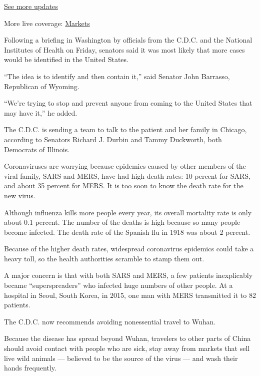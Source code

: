 \href{https://www.nytimes3xbfgragh.onion/2020/09/09/world/covid-19-coronavirus.html?action=click\&pgtype=Article\&state=default\&region=MAIN_CONTENT_1\&context=storylines_live_updates}{See
more updates}

More live coverage:
\href{https://www.nytimes3xbfgragh.onion/live/2020/09/09/business/stock-market-today-coronavirus?action=click\&pgtype=Article\&state=default\&region=MAIN_CONTENT_1\&context=storylines_live_updates}{Markets}

Following a briefing in Washington by officials from the C.D.C. and the
National Institutes of Health on Friday, senators said it was most
likely that more cases would be identified in the United States.

``The idea is to identify and then contain it,'' said Senator John
Barrasso, Republican of Wyoming.

``We're trying to stop and prevent anyone from coming to the United
States that may have it,'' he added.

The C.D.C. is sending a team to talk to the patient and her family in
Chicago, according to Senators Richard J. Durbin and Tammy Duckworth,
both Democrats of Illinois.

Coronaviruses are worrying because epidemics caused by other members of
the viral family, SARS and MERS, have had high death rates: 10 percent
for SARS, and about 35 percent for MERS. It is too soon to know the
death rate for the new virus.

Although influenza kills more people every year, its overall mortality
rate is only about 0.1 percent. The number of the deaths is high because
so many people become infected. The death rate of the Spanish flu in
1918 was about 2 percent.

Because of the higher death rates, widespread coronavirus epidemics
could take a heavy toll, so the health authorities scramble to stamp
them out.

A major concern is that with both SARS and MERS, a few patients
inexplicably became ``superspreaders'' who infected huge numbers of
other people. At a hospital in Seoul, South Korea, in 2015, one man with
MERS transmitted it to 82 patients.

The C.D.C. now recommends avoiding nonessential travel to Wuhan.

Because the disease has spread beyond Wuhan, travelers to other parts of
China should avoid contact with people who are sick, stay away from
markets that sell live wild animals --- believed to be the source of the
virus --- and wash their hands frequently.

